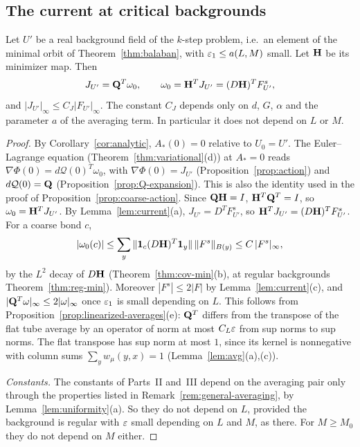 \subsection{The current at critical backgrounds}\label{ss:45.1}

\begin{lemma}\label{lem:critical-current}
Let $U'$ be a real background field of the $k$-step problem, i.e.\ an element of the minimal orbit of Theorem~\ref{thm:balaban}, with $\varepsilon_1\le a(L,M)$ small. Let $\mathbf H$ be its minimizer map. Then
\[
J_{U'}=\mathbf Q^T\omega_0,\qquad\omega_0=\mathbf H^TJ_{U'}=(D\mathbf H)^TF^s_{U'},
\]
and $|J_{U'}|_\infty\le C_J|F_{U'}|_\infty$. The constant $C_J$ depends only on $d$, $G$, $\alpha$ and the parameter $a$ of the averaging term. In particular it does not depend on $L$ or $M$.
\end{lemma}

\begin{proof}
By Corollary~\ref{cor:analytic}, $A_*(0)=0$ relative to $U_0=U'$. The Euler--Lagrange equation (Theorem~\ref{thm:variational}(d)) at $A_*=0$ reads $\nabla\Phi(0)=d\mathcal Q(0)^T\omega_0$, with $\nabla\Phi(0)=J_{U'}$ (Proposition~\ref{prop:action}) and $d\mathcal Q(0)=\mathbf Q$ (Proposition~\ref{prop:Q-expansion}). This is also the identity used in the proof of Proposition~\ref{prop:coarse-action}. Since $\mathbf Q\mathbf H=I$, $\mathbf H^T\mathbf Q^T=I$, so $\omega_0=\mathbf H^TJ_{U'}$. By Lemma~\ref{lem:current}(a), $J_{U'}=D^TF^s_{U'}$, so $\mathbf H^TJ_{U'}=(D\mathbf H)^TF^s_{U'}$. For a coarse bond $c$,
\[
|\omega_0(c)|\le\sum_{y}\|\mathbf 1_c(D\mathbf H)^T\mathbf 1_y\|\,\|F^s\|_{B(y)}\le C\,|F^s|_\infty ,
\]
by the $L^2$ decay of $D\mathbf H$ (Theorem~\ref{thm:cov-min}(b), at regular backgrounds Theorem~\ref{thm:reg-min}). Moreover $|F^s|\le2|F|$ by Lemma~\ref{lem:current}(c), and $|\mathbf Q^T\omega|_\infty\le2|\omega|_\infty$ once $\varepsilon_1$ is small depending on $L$. This follows from Proposition~\ref{prop:linearized-averages}(e): $\mathbf Q^T$ differs from the transpose of the flat tube average by an operator of norm at most $C_L\varepsilon$ from sup norms to sup norms. The flat transpose has sup norm at most $1$, since its kernel is nonnegative with column sums $\sum_yw_\mu(y,x)=1$ (Lemma~\ref{lem:avg}(a),(c)).

\emph{Constants.} The constants of Parts~II and~III depend on the averaging pair only through the properties listed in Remark~\ref{rem:general-averaging}, by Lemma~\ref{lem:uniformity}(a). So they do not depend on $L$, provided the background is regular with $\varepsilon$ small depending on $L$ and $M$, as there. For $M\ge M_0$ they do not depend on $M$ either.
\end{proof}

